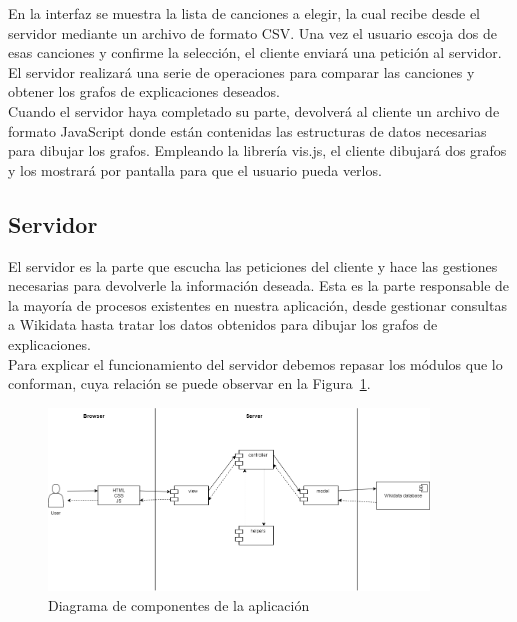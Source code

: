 En la interfaz se muestra la lista de canciones a elegir, la cual recibe desde el servidor mediante un archivo de formato CSV. Una vez el usuario escoja dos de esas canciones y confirme la selección, el cliente enviará una petición al servidor. El servidor realizará una serie de operaciones para comparar las canciones y obtener los grafos de explicaciones deseados.\\

Cuando el servidor haya completado su parte, devolverá al cliente un archivo de formato JavaScript donde están contenidas las estructuras de datos necesarias para dibujar los grafos. Empleando la librería vis.js, el cliente dibujará dos grafos y los mostrará por pantalla para que el usuario pueda verlos.\\

\subsection{Servidor}

El servidor es la parte que escucha las peticiones del cliente y hace las gestiones necesarias para devolverle la información deseada. Esta es la parte responsable de la mayoría de procesos existentes en nuestra aplicación, desde gestionar consultas a Wikidata hasta tratar los datos obtenidos para dibujar los grafos de explicaciones.\\

Para explicar el funcionamiento del servidor debemos repasar los módulos que lo conforman, cuya relación se puede observar en la Figura~\ref{fig:diagramaComponentes}.\\

\begin{figure}[h!]
	\centering
	\includegraphics[width = 0.9\textwidth]{Imagenes/Bitmap/Diagrama componentes.png}
	\caption{Diagrama de componentes de la aplicación}
	\label{fig:diagramaComponentes}
\end{figure}

